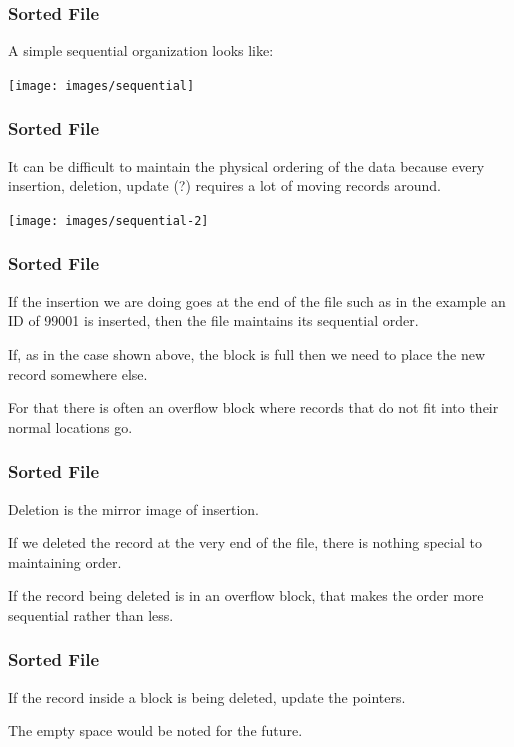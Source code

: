 \begin{frame}
\frametitle{Sorted File}
A simple sequential organization looks like:

\begin{center}
\texttt{[image: images/sequential]}
\end{center}


\end{frame}



\begin{frame}
\frametitle{Sorted File}

It can be difficult to maintain the physical ordering of the data because every insertion, deletion, update (?) requires a lot of moving records around. 


\begin{center}
\texttt{[image: images/sequential-2]}
\end{center}

\end{frame}


\begin{frame}
\frametitle{Sorted File}
If the insertion we are doing goes at the end of the file such as in the example an ID of 99001 is inserted, then the file maintains its sequential order. 

If, as in the case shown above, the block is full then we need to place the new record somewhere else. 

For that there is often an \alert{overflow block} where records that do not fit into their normal locations go. 

\end{frame}



\begin{frame}
\frametitle{Sorted File}

Deletion is the mirror image of insertion. 

If we deleted the record at the very end of the file, there is nothing special to maintaining order. 

If the record being deleted is in an overflow block, that makes the order more sequential rather than less. 

\end{frame}



\begin{frame}
\frametitle{Sorted File}

If the record inside a block is being deleted, update the pointers.

The empty space would be noted for the future. 

\end{frame}



